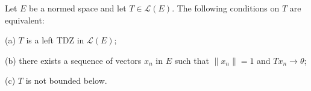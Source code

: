 Let $E$ be a normed space and let $T \in \mathcal{L}(E)$. The following conditions on $T$ are equivalent:

(a) $T$ is a left TDZ in $\mathcal{L}(E)$;

(b) there exists a sequence of vectors $x_n$ in $E$ such that $\|x_n\| = 1$ and $Tx_n \to \theta$;

(c) $T$ is not bounded below.
